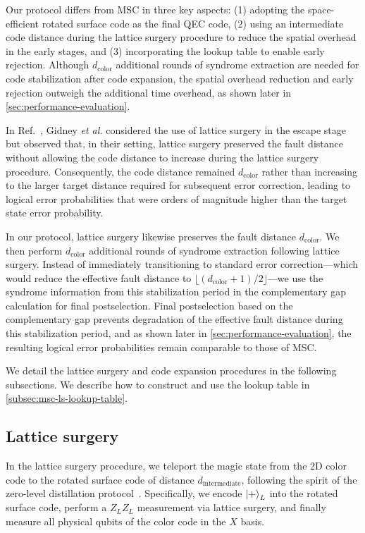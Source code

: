 Our protocol differs from MSC in three key aspects: (1) adopting the space-efficient rotated surface code as the final QEC code, (2) using an intermediate code distance during the lattice surgery procedure to reduce the spatial overhead in the early stages, and (3) incorporating the lookup table to enable early rejection.
Although $d_\mathrm{color}$ additional rounds of syndrome extraction are needed for code stabilization after code expansion, the spatial overhead reduction and early rejection outweigh the additional time overhead, as shown later in \autoref{sec:performance-evaluation}.

In Ref.~\cite{Gidney2024MagicStateCultivation}, Gidney \textit{et al.} considered the use of lattice surgery in the escape stage but observed that, in their setting, lattice surgery preserved the fault distance without allowing the code distance to increase during the lattice surgery procedure.
Consequently, the code distance remained $d_\mathrm{color}$ rather than increasing to the larger target distance required for subsequent error correction, leading to logical error probabilities that were orders of magnitude higher than the target state error probability.

In our protocol, lattice surgery likewise preserves the fault distance $d_\mathrm{color}$.
We then perform $d_\mathrm{color}$ additional rounds of syndrome extraction following lattice surgery.
Instead of immediately transitioning to standard error correction---which would reduce the effective fault distance to $\lfloor (d_\mathrm{color}+1)/2 \rfloor$---we use the syndrome information from this stabilization period in the complementary gap calculation for final postselection.
Final postselection based on the complementary gap prevents degradation of the effective fault distance during this stabilization period, and as shown later in \autoref{sec:performance-evaluation}, the resulting logical error probabilities remain comparable to those of MSC.

We detail the lattice surgery and code expansion procedures in the following subsections.
We describe how to construct and use the lookup table in \autoref{subsec:msc-ls-lookup-table}.

\subsection{Lattice surgery}
\label{subsec:msc-ls-ls}
In the lattice surgery procedure, we teleport the magic state from the 2D color code to the rotated surface code of distance $d_{\mathrm{intermediate}}$, following the spirit of the zero-level distillation protocol~\cite{itogawa2025efficient}.
Specifically, we encode $\ket{+}_L$ into the rotated surface code, perform a $Z_LZ_L$ measurement via lattice surgery, and finally measure all physical qubits of the color code in the $X$ basis.

